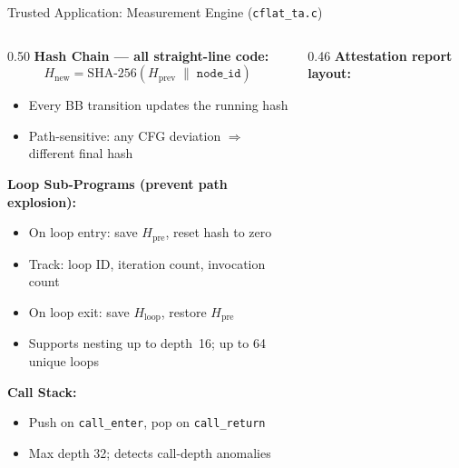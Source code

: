 \documentclass[aspectratio=169]{beamer}
\begin{document}
\begin{frame}{Trusted Application: Measurement Engine (\texttt{cflat\_ta.c})}
\begin{columns}[T]

\begin{column}{0.50\textwidth}
  \textbf{Hash Chain — all straight-line code:}
  \[
    H_{\text{new}} = \mathrm{SHA\text{-}256}\!\left(H_{\text{prev}} \;\|\; \texttt{node\_id}\right)
  \]
  \begin{itemize}
    \item Every BB transition updates the running hash
    \item Path-sensitive: any CFG deviation $\Rightarrow$ different final hash
  \end{itemize}

  \bigskip
  \textbf{Loop Sub-Programs (prevent path explosion):}
  \begin{itemize}
    \item On loop entry: save $H_{\text{pre}}$, reset hash to zero
    \item Track: loop ID, iteration count, invocation count
    \item On loop exit: save $H_{\text{loop}}$, restore $H_{\text{pre}}$
    \item Supports nesting up to depth~16; up to 64 unique loops
  \end{itemize}

  \bigskip
  \textbf{Call Stack:}
  \begin{itemize}
    \item Push on \texttt{call\_enter}, pop on \texttt{call\_return}
    \item Max depth 32; detects call-depth anomalies
  \end{itemize}
\end{column}

\begin{column}{0.46\textwidth}
  \textbf{Attestation report layout:}

\end{column}
\end{columns}
\end{frame}
\end{document}
